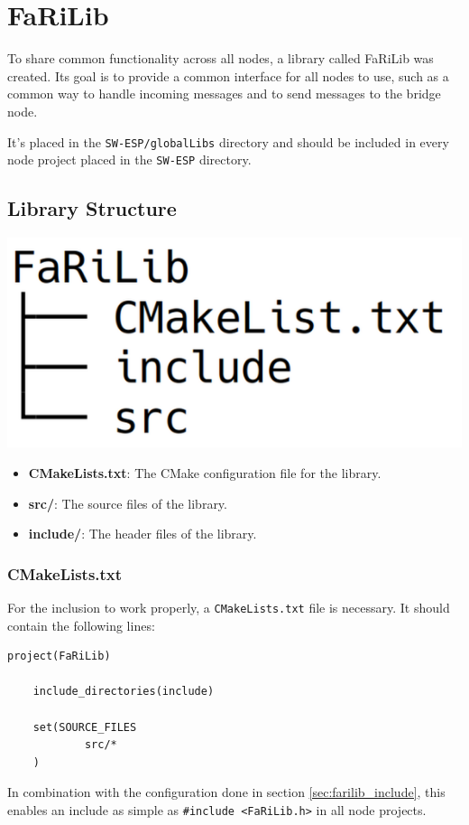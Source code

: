 \section{FaRiLib} \label{sec:farilib}
To share common functionality across all nodes, a library called FaRiLib was
created. Its goal is to provide a common interface for all nodes to use, such as
a common way to handle incoming messages and to send messages to the bridge node. 
\par\vspace{0.5em}
It's placed in the \texttt{SW-ESP/globalLibs} directory and should be included in
every node project placed in the \texttt{SW-ESP} directory.

    \subsection{Library Structure}
        \begin{minipage}{0.48\textwidth}
            \includegraphics[width=0.8\linewidth]{assets/FaRiLibStructure.png}
            \label{fig:farilib_structure}
        \end{minipage}%
        \begin{minipage}{0.48\textwidth}
            \raggedright
            \begin{itemize}
                \item \textbf{CMakeLists.txt}: The CMake configuration file for the 
                library.
                \item \textbf{src/}: The source files of the library.
                \item \textbf{include/}: The header files of the library.
            \end{itemize}
        \end{minipage}
        \subsubsection{CMakeLists.txt}
        For the inclusion to work properly, a \texttt{CMakeLists.txt} file is
        necessary. It should contain the following lines: 
    \begin{lstlisting}[style=cppCode]
    project(FaRiLib)

    include_directories(include)

    set(SOURCE_FILES
            src/*
    )
    \end{lstlisting}
        In combination with the configuration done in section \ref{sec:farilib_include},
        this enables an include as simple as \texttt{\#include <FaRiLib.h>} in all
        node projects.

